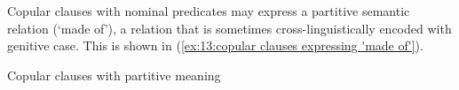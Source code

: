 
Copular clauses with nominal predicates may express a partitive semantic relation (‘made of’), a relation that is sometimes cross-linguistically encoded with genitive case. This is shown in (\ref{ex:13:copular clauses expressing 'made of'}).


\ea\label{ex:13:copular clauses expressing 'made of'}
{Copular clauses with partitive meaning}

    \z
\z


